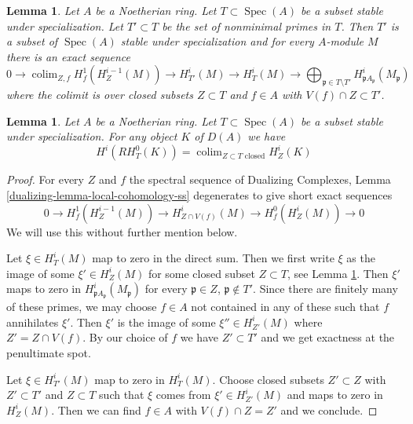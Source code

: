 \documentclass[10pt,a4paper]{amsart}
\theoremstyle{plain}
\newtheorem{lemma}[subsection]{Lemma}
\theoremstyle{definition}
\theoremstyle{remark}
\numberwithin{equation}{subsection}
\def\colim{\mathop{\mathrm{colim}}\nolimits}
\def\Spec{\mathop{\mathrm{Spec}}}
\begin{document}
\begin{lemma}
\label{lemma-filter-local-cohomology}
Let $A$ be a Noetherian ring. Let $T \subset \Spec(A)$
be a subset stable under specialization. Let $T' \subset T$ be
the set of nonminimal primes in $T$. Then $T'$
is a subset of $\Spec(A)$ stable under specialization
and for every $A$-module $M$ there is an exact sequence
$$
0 \to
\colim_{Z, f} H^1_f(H^{i - 1}_Z(M)) \to
H^i_{T'}(M) \to H^i_T(M) \to
\bigoplus\nolimits_{\mathfrak p \in T \setminus T'}
H^i_{\mathfrak p A_\mathfrak p}(M_\mathfrak p)
$$
where the colimit is over closed subsets $Z \subset T$
and $f \in A$ with $V(f) \cap Z \subset T'$.
\end{lemma}

\begin{lemma}
\label{lemma-adjoint-ext}
Let $A$ be a Noetherian ring. Let $T \subset \Spec(A)$
be a subset stable under specialization.
For any object $K$ of $D(A)$ we have
$$
H^i(RH^0_T(K)) = \colim_{Z \subset T\text{ closed}} H^i_Z(K)
$$
\end{lemma}

\begin{proof}
For every $Z$ and $f$ the spectral sequence of
Dualizing Complexes, Lemma \ref{dualizing-lemma-local-cohomology-ss}
degenerates to give short exact sequences
$$
0 \to H^1_f(H^{i - 1}_Z(M)) \to
H^i_{Z \cap V(f)}(M) \to H^0_f(H^i_Z(M)) \to 0
$$
We will use this without further mention below.

\medskip\noindent
Let $\xi \in H^i_T(M)$ map to zero in the direct sum.
Then we first write $\xi$ as the image of some $\xi' \in H^i_Z(M)$
for some closed subset $Z \subset T$, see Lemma \ref{lemma-adjoint-ext}.
Then $\xi'$ maps to zero in $H^i_{\mathfrak p A_\mathfrak p}(M_\mathfrak p)$
for every $\mathfrak p \in Z$, $\mathfrak p \not \in T'$.
Since there are finitely many of these primes,
we may choose $f \in A$ not contained in any of these
such that $f$ annihilates $\xi'$. Then $\xi'$
is the image of some $\xi'' \in H^i_{Z'}(M)$
where $Z' = Z \cap V(f)$. By our choice of $f$ we have
$Z' \subset T'$ and we get exactness at the penultimate spot.

\medskip\noindent
Let $\xi \in H^i_{T'}(M)$ map to zero in $H^i_T(M)$.
Choose closed subsets $Z' \subset Z$ with $Z' \subset T'$
and $Z \subset T$ such that $\xi$ comes from $\xi' \in H^i_{Z'}(M)$
and maps to zero in $H^i_Z(M)$. Then we can find $f \in A$
with $V(f) \cap Z = Z'$ and we conclude.
\end{proof}
\end{document}
